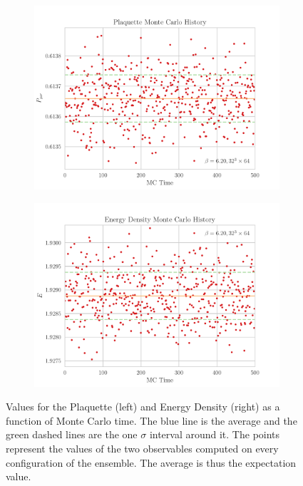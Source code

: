 \begin{figure}[hbt!]
    \centering
    \begin{subfigure}{0.45\textwidth}
        \includegraphics[width=\textwidth]{results/MCPlaq.pdf}
    \end{subfigure}
    \begin{subfigure}{0.45\textwidth}
        \includegraphics[width=\textwidth]{results/MCEnrg.pdf}
    \end{subfigure}
    \caption{\footnotesize Values for the Plaquette (left) and Energy Density (right) as a function of Monte Carlo time. The blue line is the average and the green dashed lines are the one $\sigma$ interval around it. The points represent the values of the two observables computed on every configuration of the ensemble. The average is thus the expectation value.}
    \label{fig:MCPlaqEnerg}
\end{figure} 

